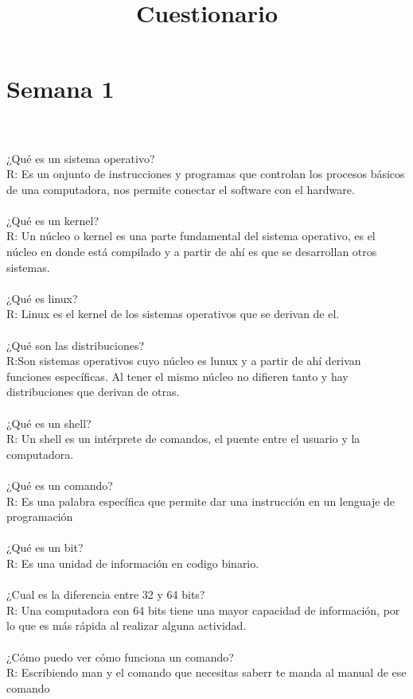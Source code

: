 \documentclass{book}
\begin{document}
	\section{Semana 1}
	\title{\Huge Cuestionario} \\
	\\
	¿Qué es un sistema operativo?\\
	R: Es un onjunto de instrucciones y programas que controlan los procesos básicos de una computadora, nos permite conectar el software con el hardware.\\
	\\
	¿Qué es un kernel?\\
	R: Un núcleo o kernel es una parte fundamental del sistema operativo, es el núcleo en donde está compilado y a partir de ahí es que se desarrollan otros sistemas.\\
	\\
	¿Qué es linux?\\
	R: Linux es el kernel de los sistemas operativos que se derivan de el.\\
	\\
	¿Qué son las distribuciones?\\
	R:Son sistemas operativos cuyo núcleo es lunux y a partir de ahí derivan funciones específicas. Al tener el mismo núcleo no difieren tanto y hay distribuciones que derivan de otras.\\
	\\
	¿Qué es un shell?\\
	R: Un shell es un intérprete de comandos, el puente entre el usuario y la computadora.\\
	\\
	¿Qué es un comando?\\
	R: Es una palabra específica que permite dar una instrucción en un lenguaje de programación\\
	\\
	¿Qué es un bit?\\
	R: Es una unidad de información en codigo binario. \\
	\\
	¿Cual es la diferencia entre 32 y 64 bits?\\
	R: Una computadora con 64 bits tiene una mayor capacidad de información, por lo que es más rápida al realizar alguna actividad.\\
	\\
	¿Cómo puedo ver cómo funciona un comando?\\
	R: Escribiendo man y el comando que necesitas saberr te manda al manual de ese comando\\
\end{document}

